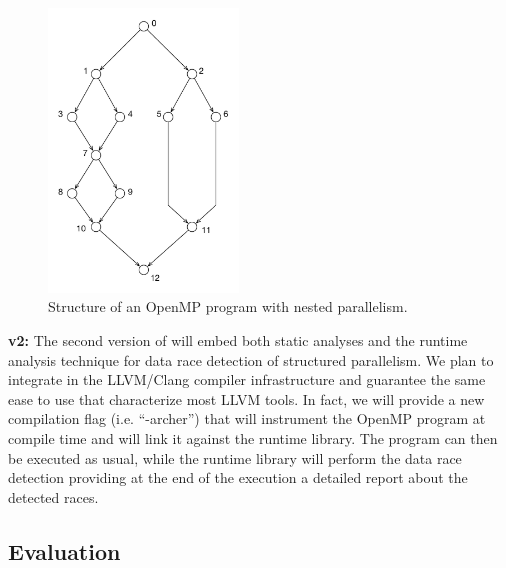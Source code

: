\begin{figure}
  \centering
  \includegraphics[width=0.45\textwidth]{figures/example01}
  \caption{Structure of an OpenMP program with nested parallelism.}
  \label{fig:example01}
\end{figure}

\textbf{\archer v2:} The second version of \archer will embed both static
analyses and the runtime analysis technique for data race detection of
structured parallelism.
%
We plan to integrate \archer in the LLVM/Clang compiler infrastructure and
guarantee the same ease to use that characterize most LLVM tools.
%
In fact, we will provide a new compilation flag (i.e. ``-archer'') that will
instrument the OpenMP program at compile time and will link it against the
\archer runtime library.
%
The program can then be executed as usual, while the \archer runtime library
will perform the data race detection providing at the end of the execution a
detailed report about the detected races.

\subsection{Evaluation}
\label{subsec:evaluation}

